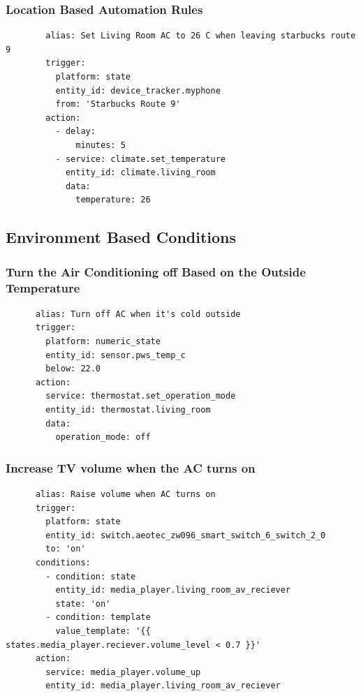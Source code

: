 \documentclass[aspectratio=169,11pt,hyperref={colorlinks=true}]{beamer}
\begin{document}
\begin{frame}[fragile=singleslide]
    \frametitle{Location Based Automation Rules}
    \begin{verbatim}
        alias: Set Living Room AC to 26 C when leaving starbucks route 9
        trigger:
          platform: state
          entity_id: device_tracker.myphone
          from: 'Starbucks Route 9'
        action:
          - delay:
              minutes: 5
          - service: climate.set_temperature
            entity_id: climate.living_room
            data:
              temperature: 26
    \end{verbatim}
\end{frame}

\subsection{Environment Based Conditions}
\begin{frame}[fragile=singleslide]
    \frametitle{Turn the Air Conditioning off Based on the Outside Temperature}
    \begin{verbatim}
      alias: Turn off AC when it's cold outside
      trigger:
        platform: numeric_state
        entity_id: sensor.pws_temp_c
        below: 22.0
      action:
        service: thermostat.set_operation_mode
        entity_id: thermostat.living_room
        data:
          operation_mode: off
    \end{verbatim}
\end{frame}

\begin{frame}[fragile=singleslide]
    \frametitle{Increase TV volume when the AC turns on}
    \begin{verbatim}
      alias: Raise volume when AC turns on
      trigger:
        platform: state
        entity_id: switch.aeotec_zw096_smart_switch_6_switch_2_0
        to: 'on'
      conditions:
        - condition: state
          entity_id: media_player.living_room_av_reciever
          state: 'on'
        - condition: template
          value_template: '{{ states.media_player.reciever.volume_level < 0.7 }}'
      action:
        service: media_player.volume_up
        entity_id: media_player.living_room_av_reciever
    \end{verbatim}
\end{frame}
\end{document}
